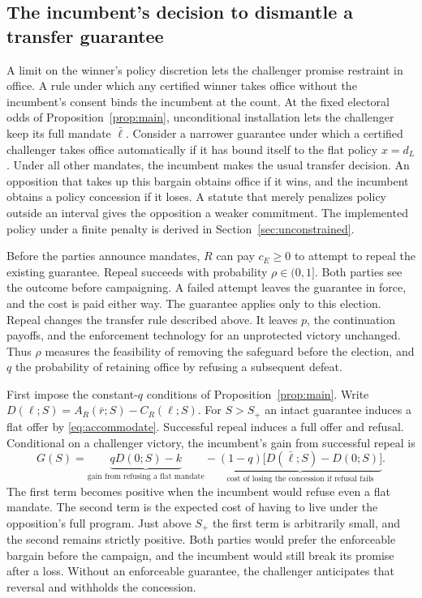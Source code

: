 \documentclass[11pt,letterpaper]{article}
\begin{document}
\subsection{The incumbent's decision to dismantle a transfer guarantee}\label{sec:guarantee}

A limit on the winner's policy discretion lets the challenger promise restraint in office. A rule under which any certified winner takes office without the incumbent's consent binds the incumbent at the count. At the fixed electoral odds of Proposition~\ref{prop:main}, unconditional installation lets the challenger keep its full mandate $\bar\ell$. Consider a narrower guarantee under which a certified challenger takes office automatically if it has bound itself to the flat policy $x=d_L$. Under all other mandates, the incumbent makes the usual transfer decision. An opposition that takes up this bargain obtains office if it wins, and the incumbent obtains a policy concession if it loses. A statute that merely penalizes policy outside an interval gives the opposition a weaker commitment. The implemented policy under a finite penalty is derived in Section~\ref{sec:unconstrained}.

Before the parties announce mandates, $R$ can pay $c_E\ge0$ to attempt to repeal the existing guarantee. Repeal succeeds with probability $\rho\in(0,1]$. Both parties see the outcome before campaigning. A failed attempt leaves the guarantee in force, and the cost is paid either way. The guarantee applies only to this election. Repeal changes the transfer rule described above. It leaves $p$, the continuation payoffs, and the enforcement technology for an unprotected victory unchanged. Thus $\rho$ measures the feasibility of removing the safeguard before the election, and $q$ the probability of retaining office by refusing a subsequent defeat.

First impose the constant-$q$ conditions of Proposition~\ref{prop:main}. Write $D(\ell;S)=A_R(\bar r;S)-C_R(\ell;S)$. For $S>S_+$ an intact guarantee induces a flat offer by \eqref{eq:accommodate}. Successful repeal induces a full offer and refusal. Conditional on a challenger victory, the incumbent's gain from successful repeal is
\begin{equation}
 G(S)=\underbrace{qD(0;S)-k}_{\text{gain from refusing a flat mandate}}
       -\underbrace{(1-q)\big[D(\bar\ell;S)-D(0;S)\big]}_{\text{cost of losing the concession if refusal fails}} .
 \label{eq:repealgain}
\end{equation}
The first term becomes positive when the incumbent would refuse even a flat mandate. The second term is the expected cost of having to live under the opposition's full program. Just above $S_+$ the first term is arbitrarily small, and the second remains strictly positive. Both parties would prefer the enforceable bargain before the campaign, and the incumbent would still break its promise after a loss. Without an enforceable guarantee, the challenger anticipates that reversal and withholds the concession.
\end{document}
